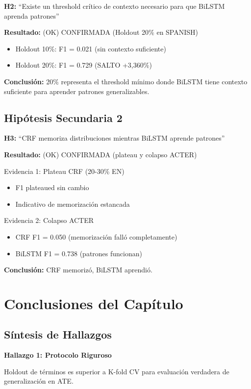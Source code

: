 \textbf{H2:} ``Existe un threshold crítico de contexto necesario para que BiLSTM aprenda patrones''

\textbf{Resultado:} (OK) CONFIRMADA (Holdout 20\% en SPANISH)

\begin{itemize}
    \item Holdout 10\%: F1 = 0.021 (sin contexto suficiente)
    \item Holdout 20\%: F1 = 0.729 (SALTO +3,360\%)
\end{itemize}

\textbf{Conclusión:} 20\% representa el threshold mínimo donde BiLSTM tiene contexto suficiente para aprender patrones generalizables.

\subsection{Hipótesis Secundaria 2}

\textbf{H3:} ``CRF memoriza distribuciones mientras BiLSTM aprende patrones''

\textbf{Resultado:} (OK) CONFIRMADA (plateau y colapso ACTER)

Evidencia 1: Plateau CRF (20-30\% EN)
\begin{itemize}
    \item F1 plateaued sin cambio
    \item Indicativo de memorización estancada
\end{itemize}

Evidencia 2: Colapso ACTER
\begin{itemize}
    \item CRF F1 = 0.050 (memorización falló completamente)
    \item BiLSTM F1 = 0.738 (patrones funcionan)
\end{itemize}

\textbf{Conclusión:} CRF memorizó, BiLSTM aprendió.

\section{Conclusiones del Capítulo}

\subsection{Síntesis de Hallazgos}

\textbf{Hallazgo 1: Protocolo Riguroso}

Holdout de términos es superior a K-fold CV para evaluación verdadera de generalización en ATE.

